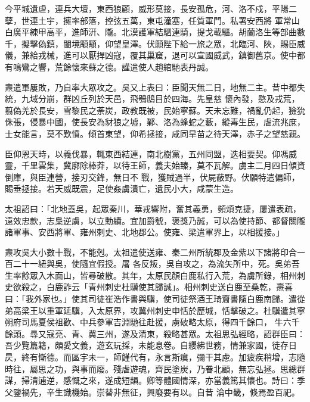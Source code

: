 \begin{pinyinscope}
 今平城遺虐，連兵大壇，東西狼顧，威形莫接，長安孤危，河、洛不戍，平陽二孽，世連土宇，擁率部落，控弦五萬，東屯潼塞，任質軍門。私署安西將
 軍常山白廣平練甲高平，進師汧、隴。北漠護軍結駟連騎，提戈載驅。胡蘭洛生等部曲數千，擬擊偽鎮，闔境顒顒，仰望皇澤。伏願陛下給一旅之眾，北臨河、陜，賜臣威儀，兼給戎械，進可以厭捍凶寇，覆其巢窟，退可以宣國威武，鎮御舊京。使中都有鳴鸞之響，荒餘懷來蘇之德。謹遣使人趙綰馳表丹誠。



 燾遣軍屢敗，乃自率大眾攻之。吳又上表曰：臣聞天無二日，地無二主。昔中都失統，九域分崩，群凶丘列於天邑，飛鴞鴟目於四海。先皇慈
 懷內發，愍及戎荒，翦偽羌於長安，雪黎民之荼炭，政教既被，民始寧蘇。天未忘難，禍亂仍起，獫狁侏張，侵暴中國，使長安為豺狼之墟，鄴、洛為蜂蛇之藪，縱毒生民，虐流兆庶，士女能言，莫不歎憤。傾首東望，仰希拯接，咸同旱苗之待天澤，赤子之望慈親。



 臣仰恩天時，以義伐暴，輒東西結連，南北樹黨，五州同盟，迭相要契。仰馮威靈，千里雲集，冀廓除棒莽，以待王師，義夫始臻，莫不瓦解。虜主二月四日傾資倒庫，與臣連營，接刃交鋒，無日不
 戰，獲賊過半，伏屍蔽野。伏願特遣偏師，賜垂拯接。若天威既震，足使姦虜潰亡，遺民小大，咸蒙生造。



 太祖詔曰：「北地蓋吳，起眾秦川，華戎響附，奮其義勇，頻煩克捷，屢遣表疏，遠效忠款，志梟逆虜，以立勳績。宜加爵號，褒獎乃誠，可以為使持節、都督關隴諸軍事、安西將軍、雍州刺史、北地郡公。使雍、梁遣軍界上，以相援接。」



 燾攻吳大小數十戰，不能剋。太祖遣使送雍、秦二州所統郡及金紫以下諸將印合一百二十一紐與吳，使隨宜假授。屠
 各反叛，吳自攻之，為流矢所中，死。吳弟吾生率餘眾入木面山，皆尋破散。其年，太原民顏白鹿私行入荒，為虜所錄，相州刺史欲殺之，白鹿詐云「青州刺史杜驥使其歸誠」。相州刺史送白鹿至桑乾，燾喜曰：「我外家也。」使其司徒崔浩作書與驥，使司徒祭酒王琦齎書隨白鹿南歸。遣從弟高梁王以重軍延驥，入太原界，攻冀州刺史申恬於歷城，恬擊破之。杜驥遣其寧朔府司馬夏侯祖歡、中兵參軍吉淵馳往赴援，虜破略太原，得四千餘口，
 牛六千餘頭。尋又寇兗、青、冀三州，遂及清東，殺略甚眾。太祖思弘經略，詔群臣曰：吾少覽篇籍，頗愛文義，遊玄玩採，未能息卷。自纓紼世務，情兼家國，徒存日昃，終有慚德。而區宇未一，師饉代有，永言斯瘼，彌干其慮。加疲疾稍增，志隨時往，屬思之功，與事而廢。殘虐遊魂，齊民塗炭，乃眷北顧，無忘弘拯。思總群謀，掃清逋逆，感慨之來，遂成短韻。卿等體國情深，亦當義篤其懷也。詩曰：季父鑒禍先，辛生識機始。崇替非無征，興廢要有以。自昔
 淪中畿，倏焉盈百祀。




\end{pinyinscope}
